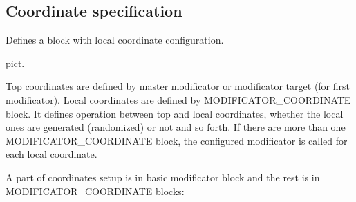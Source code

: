 \documentclass[9pt]{article}
\begin{document}
\subsection{Coordinate specification}

Defines a block with local coordinate configuration.

pict.

Top coordinates are defined by master modificator or modificator target
(for first modificator). Local coordinates are defined by MODIFICATOR\_COORDINATE
block. It defines operation between top and local coordinates, whether the local
ones are generated (randomized) or not and so forth. If there are more than one
MODIFICATOR\_COORDINATE block, the configured modificator is called for each local
coordinate.

A part of coordinates setup is in basic modificator block and the rest 
is in MODIFICATOR\_COORDINATE blocks:
\end{document}
